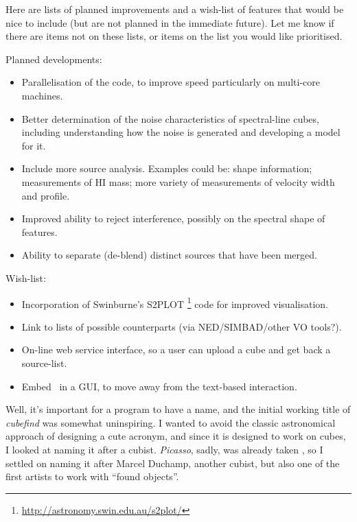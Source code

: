 
Here are lists of planned improvements and a wish-list of
features that would be nice to include (but are not planned in the
immediate future). Let me know if there are items not on these lists,
or items on the list you would like prioritised.

Planned developments:
\begin{itemize}
\item Parallelisation of the code, to improve speed particularly on
multi-core machines.

\item Better determination of the noise characteristics of
  spectral-line cubes, including understanding how the noise is
  generated and developing a model for it. 
  
\item Include more source analysis. Examples could be: shape
  information; measurements of HI mass; more variety of measurements
  of velocity width and profile. 

\item Improved ability to reject interference, possibly on the
  spectral shape of features.

\item Ability to separate (de-blend) distinct sources that have been
  merged.
\end{itemize}

Wish-list:
\begin{itemize}
\item Incorporation of Swinburne's S2PLOT
\footnote{\href{http://astronomy.swin.edu.au/s2plot/}
{http://astronomy.swin.edu.au/s2plot/}} code for improved
visualisation. 
\item Link to lists of possible counterparts (\eg via NED/SIMBAD/other
  VO tools?). 

\item On-line web service interface, so a user can upload a cube and
  get back a source-list.

\item Embed \duchamp\ in a GUI, to move away from the text-based
  interaction.
\end{itemize}


Well, it's important for a program to have a name, and the initial
working title of \emph{cubefind} was somewhat uninspiring. I wanted to
avoid the classic astronomical approach of designing a cute acronym,
and since it is designed to work on cubes, I looked at naming it after
a cubist. \emph{Picasso}, sadly, was already taken \citep{minchin99},
so I settled on naming it after Marcel Duchamp, another cubist, but
also one of the first artists to work with ``found objects''.

